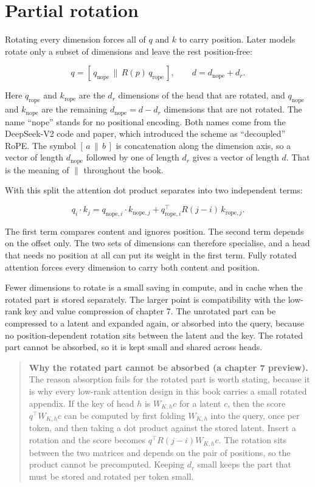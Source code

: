 \hypertarget{partial-rotation}{%
\section{Partial rotation}\label{partial-rotation}}

Rotating every dimension forces all of \(q\) and \(k\) to carry
position. Later models rotate only a subset of dimensions and leave the
rest position-free:

\[
q = [\,q_{\text{nope}} \,\|\, R(p)\, q_{\text{rope}}\,], \qquad d = d_{\text{nope}} + d_r .
\]

Here \(q_{\text{rope}}\) and \(k_{\text{rope}}\) are the \(d_r\)
dimensions of the head that are rotated, and \(q_{\text{nope}}\) and
\(k_{\text{nope}}\) are the remaining \(d_{\text{nope}} = d - d_r\)
dimensions that are not rotated. The name ``nope'' stands for no
positional encoding. Both names come from the DeepSeek-V2 code and
paper, which introduced the scheme as ``decoupled'' RoPE. The symbol
\([\,a \,\|\, b\,]\) is concatenation along the dimension axis, so a
vector of length \(d_{\text{nope}}\) followed by one of length \(d_r\)
gives a vector of length \(d\). That is the meaning of \(\|\) throughout
the book.

With this split the attention dot product separates into two independent
terms:

\[
q_i \cdot k_j = q_{\text{nope},i} \cdot k_{\text{nope},j} + q_{\text{rope},i}^{\top} R(j - i)\, k_{\text{rope},j} .
\]

The first term compares content and ignores position. The second term
depends on the offset only. The two sets of dimensions can therefore
specialise, and a head that needs no position at all can put its weight
in the first term. Fully rotated attention forces every dimension to
carry both content and position.

Fewer dimensions to rotate is a small saving in compute, and in cache
when the rotated part is stored separately. The larger point is
compatibility with the low-rank key and value compression of chapter 7.
The unrotated part can be compressed to a latent and expanded again, or
absorbed into the query, because no position-dependent rotation sits
between the latent and the key. The rotated part cannot be absorbed, so
it is kept small and shared across heads.

\begin{quote}
\textbf{Why the rotated part cannot be absorbed (a chapter 7 preview).}
The reason absorption fails for the rotated part is worth stating,
because it is why every low-rank attention design in this book carries a
small rotated appendix. If the key of head \(h\) is \(W_{K,h} c\) for a
latent \(c\), then the score \(q^{\top} W_{K,h} c\) can be computed by
first folding \(W_{K,h}\) into the query, once per token, and then
taking a dot product against the stored latent. Insert a rotation and
the score becomes \(q^{\top} R(j-i) W_{K,h} c\). The rotation sits
between the two matrices and depends on the pair of positions, so the
product cannot be precomputed. Keeping \(d_r\) small keeps the part that
must be stored and rotated per token small.
\end{quote}

